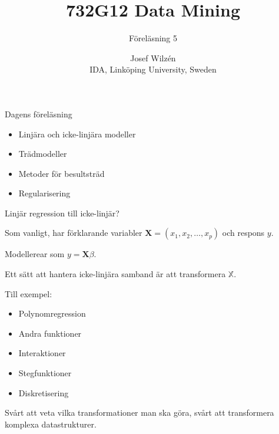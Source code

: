 \documentclass[10pt,english]{beamer}
\title{732G12 Data Mining}
\subtitle{Föreläsning 5}
\date{}
\author{Josef Wilzén \\ IDA, Linköping University, Sweden}
\begin{document}
\maketitle

\begin{frame}{Dagens föreläsning}
    
    \begin{itemize}
        \item Linjära och icke-linjära modeller
        \item Trädmodeller
        \item Metoder för besultsträd
        \item Regularisering
    \end{itemize}

\end{frame}


\begin{frame}{Linjär regression till icke-linjär?}
    
    Som vanligt, har förklarande variabler $\mathbf{X} = (x_1, x_2, \ldots, x_p)$ och respons $y$.

    Modellerear som $y = \mathbf{X}\beta$.

    Ett sätt att hantera icke-linjära samband är att transformera $\mathbb{X}$.

    Till exempel:
    \begin{itemize}
        \item Polynomregression
        \item Andra funktioner
        \item Interaktioner
        \item Stegfunktioner
        \item Diskretisering
    \end{itemize}

    Svårt att veta vilka transformationer man ska göra, svårt att transformera komplexa datastrukturer.

\end{frame}
\end{document}
